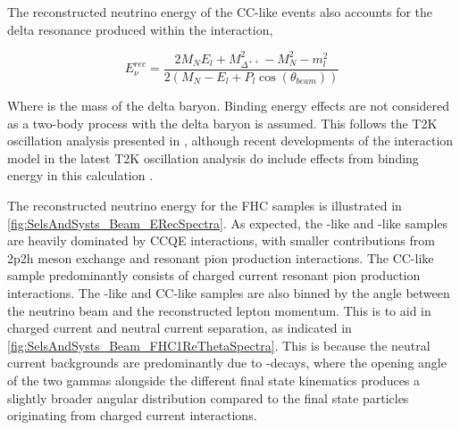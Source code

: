 The reconstructed neutrino energy of the CC\quickmath{1\pi^{+}}-like events also accounts for the delta resonance produced within the interaction,

\begin{equation}
  \label{sec:SelsAndSysts_Erec_CCRES}
  E^{rec}_{\nu} = \frac{2M_{N}E_{l} + M_{\Delta^{++}}^{2} - M_{N}^{2} - m_{l}^{2}}{2(M_{N} - E_{l} + P_{l}\cos(\theta_{beam}))}
\end{equation}

Where  is the mass of the delta baryon. Binding energy effects are not considered as a two-body process with the delta baryon is assumed. This follows the T2K oscillation analysis presented in \cite{Dunne2020-uf}, although recent developments of the interaction model in the latest T2K oscillation analysis do include effects from binding energy in this calculation \cite{t2k_tn_414}.

The reconstructed neutrino energy for the FHC samples is illustrated in \autoref{fig:SelsAndSysts_Beam_ERecSpectra}. As expected, the -like and -like samples are heavily dominated by CCQE interactions, with smaller contributions from 2p2h meson exchange and resonant pion production interactions. The CC\quickmath{1\pi^{+}}-like sample predominantly consists of charged current resonant pion production interactions. The -like and CC\quickmath{1\pi^{+}}-like samples are also binned by the angle between the neutrino beam and the reconstructed lepton momentum. This is to aid in charged current and neutral current separation, as indicated in \autoref{fig:SelsAndSysts_Beam_FHC1ReThetaSpectra}. This is because the neutral current backgrounds are predominantly due to -decays, where the opening angle of the two gammas alongside the different final state kinematics produces a slightly broader angular distribution compared to the final state particles originating from charged current  interactions.

